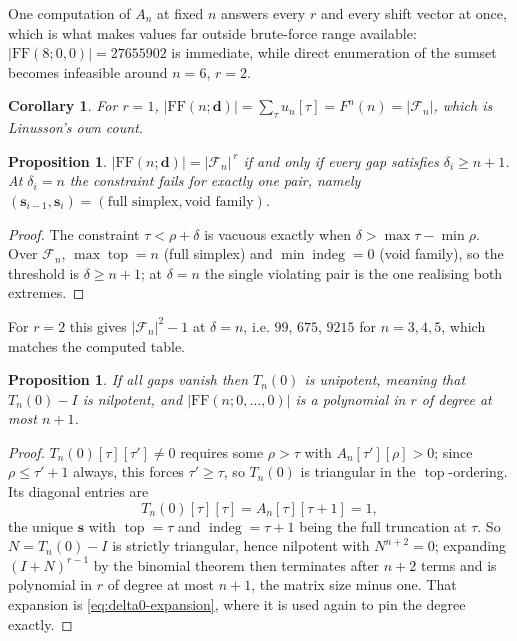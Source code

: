 \documentclass[11pt, a4paper, abstract=yes]{scrartcl}
\theoremstyle{definition}
\theoremstyle{remark}
\theoremstyle{plain}
\newtheorem{proposition}[definition]{Proposition}
\newtheorem{corollary}[definition]{Corollary}
\newcommand{\vek}[1]{\boldsymbol{#1}}
\newcommand{\indeg}{\operatorname{indeg}}
\newcommand{\tp}{\operatorname{top}}
\begin{document}
One computation of \(A_n\) at fixed \(n\) answers every \(r\) and every shift vector at once, which
is what makes values far outside brute-force range available: \(|\mathrm{FF}(8;0,0)|=27655902\) is immediate, while direct enumeration of the sumset
becomes infeasible around \(n=6\), \(r=2\).

\begin{corollary}
For \(r=1\), \(|\mathrm{FF}(n;\vek d)|=\sum_\tau u_n[\tau]=F^n(n)=|\mathcal F_n|\), which is Linusson's own count.
\label{cor-r1}
\end{corollary}

\begin{proposition}
\(|\mathrm{FF}(n;\vek d)|=|\mathcal F_n|^{\,r}\) if and only if every gap satisfies \(\delta_i\ge n+1\).
At \(\delta_i=n\) the constraint fails for exactly one pair, namely
\((\vek s_{i-1},\vek s_i)=(\text{full simplex},\text{void family})\).
\label{prop-threshold}
\end{proposition}

\begin{proof}
The constraint \(\tau<\rho+\delta\) is vacuous exactly when \(\delta>\max\tau-\min\rho\). Over
\(\mathcal F_n\), \(\max\tp=n\) (full simplex) and \(\min\indeg=0\) (void family), so the threshold is
\(\delta\ge n+1\); at \(\delta=n\) the single violating pair is the one realising both extremes.
\end{proof}

For \(r=2\) this gives \(|\mathcal F_n|^2-1\) at \(\delta=n\), i.e. \(99\), \(675\), \(9215\) for
\(n=3,4,5\), which matches the computed table.

\begin{proposition}
If all gaps vanish then \(T_n(0)\) is unipotent, meaning that \(T_n(0)-I\) is nilpotent, and
\(|\mathrm{FF}(n;0,\dots,0)|\) is a polynomial in
\(r\) of degree at most \(n+1\).
\label{prop-delta0}
\end{proposition}

\begin{proof}
\(T_n(0)[\tau][\tau']\ne0\) requires some \(\rho>\tau\) with \(A_n[\tau'][\rho]>0\); since
\(\rho\le\tau'+1\) always, this forces \(\tau'\ge\tau\), so \(T_n(0)\) is triangular in the
\(\tp\)-ordering. Its diagonal entries are
\[
  T_n(0)[\tau][\tau]=A_n[\tau][\tau+1]=1 ,
\]
the unique
\(\vek s\) with \(\tp=\tau\) and \(\indeg=\tau+1\) being the full truncation at \(\tau\). So
\(N=T_n(0)-I\) is strictly triangular, hence nilpotent with \(N^{n+2}=0\); expanding
\((I+N)^{r-1}\) by the binomial theorem then terminates after \(n+2\) terms and is polynomial in
\(r\) of degree at most \(n+1\), the matrix size minus one. That expansion is
\eqref{eq:delta0-expansion}, where it is used again to pin the degree exactly.
\end{proof}
\end{document}
